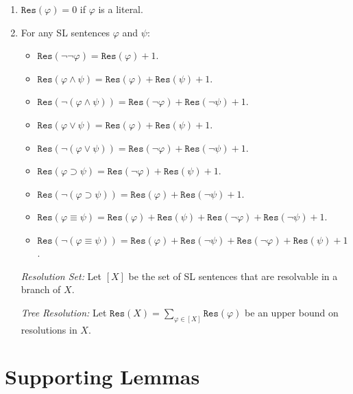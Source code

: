 \documentclass[a4paper, 11pt]{article} %
\newcommand{\res}{\texttt{Res}}
\begin{document}
\begin{enumerate}
  \item $\res(\varphi)=0$ if $\varphi$ is a literal.
  \item For any SL sentences $\varphi$ and $\psi$:
    \begin{itemize}
      \item $\res(\neg\neg\varphi)=\res(\varphi)+1$.
      \item $\res(\varphi \wedge \psi)=\res(\varphi)+\res(\psi)+1$.
      \item $\res(\neg(\varphi \wedge \psi))=\res(\neg\varphi)+\res(\neg\psi)+1$.
      \item $\res(\varphi \vee \psi)=\res(\varphi)+\res(\psi)+1$.
      \item $\res(\neg(\varphi \vee \psi))=\res(\neg\varphi)+\res(\neg\psi)+1$.
      \item $\res(\varphi \supset \psi)=\res(\neg\varphi)+\res(\psi)+1$.
      \item $\res(\neg(\varphi \supset \psi))=\res(\varphi)+\res(\neg\psi)+1$.
      \item $\res(\varphi \equiv \psi)=\res(\varphi)+\res(\psi) + \res(\neg\varphi)+\res(\neg\psi)+1$.
      \item $\res(\neg(\varphi \equiv \psi))=\res(\varphi) + \res(\neg\psi) + \res(\neg\varphi)+\res(\psi)+1$.
    \end{itemize}
  \item[\it Resolution Set:] Let $[X]$ be the set of SL sentences that are resolvable in a branch of $X$. 
  \item[\it Tree Resolution:] Let $\res(X)=\sum\limits_{\varphi\in [X]}\res(\varphi)$ be an upper bound on resolutions in $X$.
\end{enumerate}




\section*{Supporting Lemmas}
\end{document}
